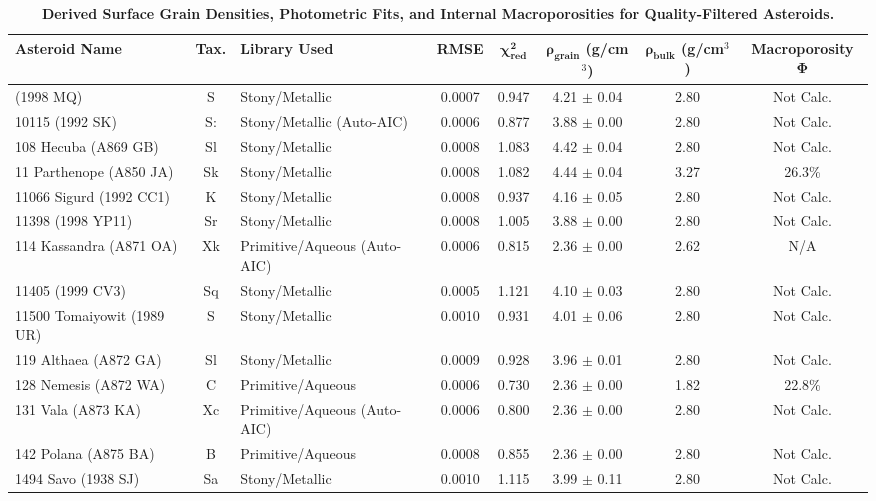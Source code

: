 {\footnotesize
\setlength{\tabcolsep}{3pt}
\begin{longtable}{p{2.6cm} c p{2.2cm} c c c c c}
\caption{\textbf{Derived Surface Grain Densities, Photometric Fits, and Internal Macroporosities for Quality-Filtered Asteroids.}} \label{tab:asteroid_results} \\
\toprule
\textbf{Asteroid Name} & \textbf{Tax.} & \textbf{Library Used} & \textbf{RMSE} & $\boldsymbol{\chi^2_{\text{red}}}$ & $\boldsymbol{\rho_{\text{grain}}}$ \textbf{(g/cm}$^3$\textbf{)} & $\boldsymbol{\rho_{\text{bulk}}}$ \textbf{(g/cm}$^3$\textbf{)} & \textbf{Macroporosity } $\boldsymbol{\Phi}$ \\
\midrule
\endhead
\bottomrule
\endfoot
100926 (1998 MQ) & S & Stony/Metallic & 0.0007 & 0.947 & 4.21 $\pm$ 0.04 & 2.80 & Not Calc. \\
10115 (1992 SK) & S: & Stony/Metallic (Auto-AIC) & 0.0006 & 0.877 & 3.88 $\pm$ 0.00 & 2.80 & Not Calc. \\
108 Hecuba (A869 GB) & Sl & Stony/Metallic & 0.0008 & 1.083 & 4.42 $\pm$ 0.04 & 2.80 & Not Calc. \\
11 Parthenope (A850 JA) & Sk & Stony/Metallic & 0.0008 & 1.082 & 4.44 $\pm$ 0.04 & 3.27 & 26.3\% \\
11066 Sigurd (1992 CC1) & K & Stony/Metallic & 0.0008 & 0.937 & 4.16 $\pm$ 0.05 & 2.80 & Not Calc. \\
11398 (1998 YP11) & Sr & Stony/Metallic & 0.0008 & 1.005 & 3.88 $\pm$ 0.00 & 2.80 & Not Calc. \\
114 Kassandra (A871 OA) & Xk & Primitive/Aqueous (Auto-AIC) & 0.0006 & 0.815 & 2.36 $\pm$ 0.00 & 2.62 & N/A \\
11405 (1999 CV3) & Sq & Stony/Metallic & 0.0005 & 1.121 & 4.10 $\pm$ 0.03 & 2.80 & Not Calc. \\
11500 Tomaiyowit (1989 UR) & S & Stony/Metallic & 0.0010 & 0.931 & 4.01 $\pm$ 0.06 & 2.80 & Not Calc. \\
119 Althaea (A872 GA) & Sl & Stony/Metallic & 0.0009 & 0.928 & 3.96 $\pm$ 0.01 & 2.80 & Not Calc. \\
128 Nemesis (A872 WA) & C & Primitive/Aqueous & 0.0006 & 0.730 & 2.36 $\pm$ 0.00 & 1.82 & 22.8\% \\
131 Vala (A873 KA) & Xc & Primitive/Aqueous (Auto-AIC) & 0.0006 & 0.800 & 2.36 $\pm$ 0.00 & 2.80 & Not Calc. \\
142 Polana (A875 BA) & B & Primitive/Aqueous & 0.0008 & 0.855 & 2.36 $\pm$ 0.00 & 2.80 & Not Calc. \\
1494 Savo (1938 SJ) & Sa & Stony/Metallic & 0.0010 & 1.115 & 3.99 $\pm$ 0.11 & 2.80 & Not Calc. \\

\end{longtable}}
